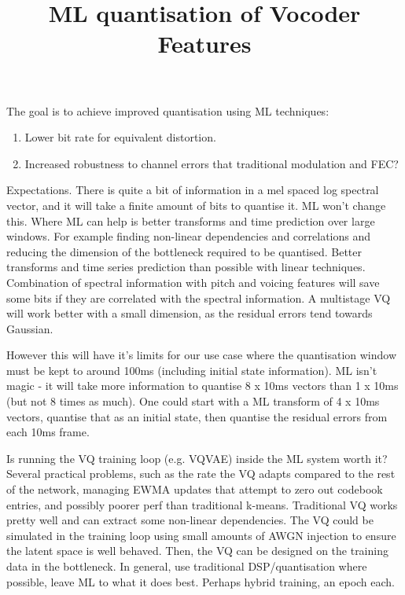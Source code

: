 \documentclass{article}
\begin{document}
\title{ML quantisation of Vocoder Features}
\maketitle

The goal is to achieve improved quantisation using ML techniques:
\begin{enumerate}
\item Lower bit rate for equivalent distortion.  
\item Increased robustness to channel errors that traditional modulation and FEC?
\end{enumerate}

Expectations.  There is quite a bit of information in a mel spaced log spectral vector, and it will take a finite amount of bits to quantise it.  ML won't change this. Where ML can help is better transforms and time prediction over large windows.  For example finding non-linear dependencies and correlations and reducing the dimension of the bottleneck required to be quantised.  Better transforms and time series prediction than possible with linear techniques. Combination of spectral information with pitch and voicing features will save some bits if they are correlated with the spectral information.  A multistage VQ will work better with a small dimension, as the residual errors tend towards Gaussian.

However this will have it's limits for our use case where the quantisation window must be kept to around 100ms (including initial state information). ML isn't magic - it will take more information to quantise 8 x 10ms vectors than 1 x 10ms (but not 8 times as much).  One could start with a ML transform of 4 x 10ms vectors, quantise that as an initial state, then quantise the residual errors from each 10ms frame.

Is running the VQ training loop (e.g. VQVAE) inside the ML system worth it?  Several practical problems, such as the rate the VQ adapts compared to the rest of the network, managing EWMA updates that attempt to zero out codebook entries, and possibly poorer perf than traditional k-means.  Traditional VQ works pretty well and can extract some non-linear dependencies. The VQ could be simulated in the training loop using small amounts of AWGN injection to ensure the latent space is well behaved. Then, the VQ can be designed on the training data in the bottleneck. In general, use traditional DSP/quantisation where possible, leave ML to what it does best.  Perhaps hybrid training, an epoch each.
\end{document}
